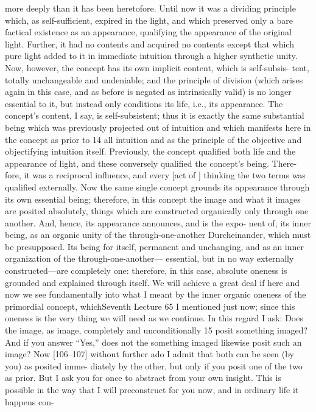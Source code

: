 more deeply than it has been heretofore. Until now it was a dividing principle
which, as self-sufficient, expired in the light, and which preserved only a bare
factical existence as an appearance, qualifying the appearance of the original
light. Further, it had no contents and acquired no contents except that which
pure light added to it in immediate intuition through a higher synthetic unity.
Now, however, the concept has its own implicit content, which is self-subsis-
tent, totally unchangeable and undeniable; and the principle of division (which
arises again in this case, and as before is negated as intrinsically valid) is no
longer essential to it, but instead only conditions its life, i.e., its appearance. The
concept’s content, I say, is self-subsistent; thus it is exactly the same substantial
being which was previously projected out of intuition and which manifests here
in the concept as prior to 14 all intuition and as the principle of the objective and
objectifying intuition itself. Previously, the concept qualified both life and the
appearance of light, and these conversely qualified the concept’s being. There-
fore, it was a reciprocal influence, and every [act of ] thinking the two terms was
qualified externally. Now the same single concept grounds its appearance
through its own essential being; therefore, in this concept the image and what
it images are posited absolutely, things which are constructed organically only
through one another. And, hence, its appearance announces, and is the expo-
nent of, its inner being, as an organic unity of the through-one-another
{Durcheinander}, which must be presupposed. Its being for itself, permanent
and unchanging, and as an inner organization of the through-one-another—
essential, but in no way externally constructed—are completely one: therefore,
in this case, absolute oneness is grounded and explained through itself.
We will achieve a great deal if here and now we see fundamentally into
what I meant by the inner organic oneness of the primordial concept, whichSeventh Lecture
65
I mentioned just now; since this oneness is the very thing we will need as we
continue. In this regard I ask: Does the image, as image, completely and
unconditionally 15 posit something imaged? And if you answer “Yes,” does
not the something imaged likewise posit such an image? Now [106–107]
without further ado I admit that both can be seen (by you) as posited imme-
diately by the other, but only if you posit one of the two as prior. But I ask
you for once to abstract from your own insight. This is possible in the way
that I will preconstruct for you now, and in ordinary life it happens con-
